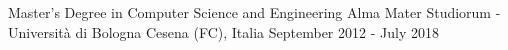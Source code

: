 

\begin{cventries}

  \cventry
    {Master's Degree in Computer Science and Engineering} %
    {Alma Mater Studiorum - Università di Bologna} %
    {Cesena (FC), Italia} %
    {September 2012 - July 2018} %
    {}


%




\end{cventries}
